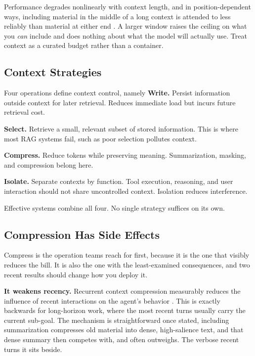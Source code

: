 Performance degrades nonlinearly with context length, and in position-dependent
ways, including material in the middle of a long context is attended to less reliably than
material at either end \cite{liu2024lost}. A larger window raises the ceiling on
what you \emph{can} include and does nothing about what the model will actually
use. Treat context as a curated budget rather than a container.

\subsection{Context Strategies}

Four operations define context control, namely \textbf{Write.}
Persist information outside context for later retrieval. Reduces immediate load but incurs future retrieval cost.

\textbf{Select.}
Retrieve a small, relevant subset of stored information. This is where most RAG systems fail, such as poor selection pollutes context.

\textbf{Compress.}
Reduce tokens while preserving meaning. Summarization, masking, and compression belong here.

\textbf{Isolate.}
Separate contexts by function. Tool execution, reasoning, and user interaction should not share uncontrolled context. Isolation reduces interference.

Effective systems combine all four. No single strategy suffices on its own.

\subsection{Compression Has Side Effects}

Compress is the operation teams reach for first, because it is the one that
visibly reduces the bill. It is also the one with the least-examined consequences,
and two recent results should change how you deploy it.

\textbf{It weakens recency.} Recurrent context compression measurably reduces the
influence of recent interactions on the agent's behavior
\cite{compressreliab2026}. This is exactly backwards for long-horizon work, where
the most recent turns usually carry the current sub-goal. The mechanism is
straightforward once stated, including summarization compresses old material into dense,
high-salience text, and that dense summary then competes with, and often
outweighs. The verbose recent turns it sits beside.

